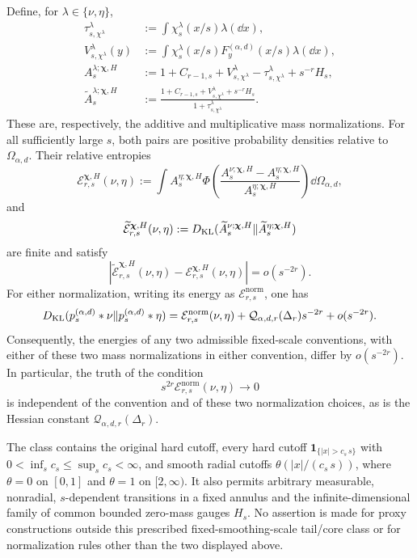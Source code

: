 \begin{unnumberedproposition}
Define, for \(\lambda\in\{\nu,\eta\}\),
\begin{align*}
 \tau_{s,\chi^\lambda}^\lambda
  &:=\int\chi_s^\lambda(x/s)\lambda(\dd x),\\
 V_{s,\chi^\lambda}^\lambda(y)
  &:=\int\chi_s^\lambda(x/s)F_y^{(\alpha,d)}(x/s)\lambda(\dd x),\\
 A_s^{\lambda;\boldsymbol\chi,H}
  &:=1+C_{r-1,s}+V_{s,\chi^\lambda}^\lambda-
       \tau_{s,\chi^\lambda}^\lambda+s^{-r}H_s,\\
 \widetilde A_s^{\lambda;\boldsymbol\chi,H}
  &:=\frac{1+C_{r-1,s}+V_{s,\chi^\lambda}^\lambda+s^{-r}H_s}
          {1+\tau_{s,\chi^\lambda}^\lambda}.
\end{align*}
These are, respectively, the additive and multiplicative mass
normalizations.  For all sufficiently large \(s\), both pairs are positive
probability densities relative to \(\Omega_{\alpha,d}\).  Their relative
entropies
\[
 \mathcal E_{r,s}^{\boldsymbol\chi,H}(\nu,\eta)
 :=\int A_s^{\eta;\boldsymbol\chi,H}
 \Phi\!\left(
  \frac{A_s^{\nu;\boldsymbol\chi,H}
        -A_s^{\eta;\boldsymbol\chi,H}}
       {A_s^{\eta;\boldsymbol\chi,H}}
 \right)\dd\Omega_{\alpha,d},
\]
and
\[
 \widetilde{\mathcal E}_{r,s}^{\boldsymbol\chi,H}(\nu,\eta)
 :=D_{\rm KL}(\widetilde A_s^{\nu;\boldsymbol\chi,H}
              \|\widetilde A_s^{\eta;\boldsymbol\chi,H})
\]
are finite and satisfy
\[
 \left|\widetilde{\mathcal E}_{r,s}^{\boldsymbol\chi,H}(\nu,\eta)
       -\mathcal E_{r,s}^{\boldsymbol\chi,H}(\nu,\eta)\right|
 =o(s^{-2r}).
\]
For either normalization, writing its energy as
\(\mathcal E_{r,s}^{\mathrm{norm}}\), one has
\[
 D_{\rm KL}(p_s^{(\alpha,d)}*\nu\|p_s^{(\alpha,d)}*\eta)
 =\mathcal E_{r,s}^{\mathrm{norm}}(\nu,\eta)
  +\mathcal Q_{\alpha,d,r}(\Delta_r)s^{-2r}+o(s^{-2r}).
\]
Consequently, the energies of any two admissible fixed-scale conventions,
with either of these two mass normalizations in either convention, differ by
\(o(s^{-2r})\).  In particular, the truth of the condition
\[
 s^{2r}\mathcal E_{r,s}^{\mathrm{norm}}(\nu,\eta)\longrightarrow0
\]
is independent of the convention and of these two normalization choices,
as is the Hessian constant \(\mathcal Q_{\alpha,d,r}(\Delta_r)\).

The class contains the original hard cutoff, every hard cutoff
\(\mathbf1_{\{|x|>c_s\,s\}}\) with
\(0<\inf_sc_s\le\sup_sc_s<\infty\), and smooth radial cutoffs
\(\theta(|x|/(c_s\,s))\), where \(\theta=0\) on \([0,1]\) and \(\theta=1\)
on \([2,\infty)\).  It also permits arbitrary measurable, nonradial,
\(s\)-dependent transitions in a fixed annulus and the infinite-dimensional
family of common bounded zero-mass gauges \(H_s\).
No assertion is made for proxy constructions outside this prescribed
fixed-smoothing-scale tail/core class or for normalization rules other than
the two displayed above.
\end{unnumberedproposition}


